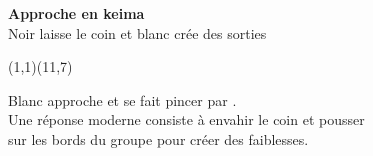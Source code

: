 \documentclass[preview, border=0pt, varwidth=false]{standalone}
\begin{document}
	\setgounit{0.6cm} 
	
\parbox[c][14.65cm][c]{10.2cm}{
	\centering
	
	{\Large\textbf{Approche en keima} \\ Noir laisse le coin et blanc crée des sorties}
	\vspace{3em}
	
	\begin{psgopartialboard}{(1,1)(11,7)}
		\pass
	\end{psgopartialboard}
	
	\vspace{1em}
	Blanc approche et se fait pincer par . \\ Une réponse moderne consiste à envahir le coin et pousser \\ sur les bords du groupe pour créer des faiblesses.
}
\end{document}
